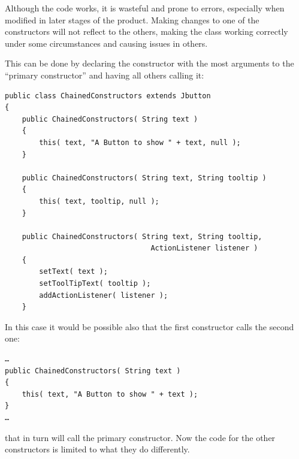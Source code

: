\documentclass[11pt,a4paper, titlepage, parskip=half, headsepline, footsepline, cleardoublepage=current, headheight=1cm]{scrbook}
\begin{document}
Although the code works, it is wasteful and prone to errors, especially when modified in later stages of the product. Making changes to one of the constructors will not reflect to the others, making the class working correctly under some circumstances and causing issues in others.

This can be done by declaring the constructor with the most arguments to the “primary constructor” and having all others calling it:
\begin{lstlisting}
public class ChainedConstructors extends Jbutton
{
    public ChainedConstructors( String text )
    {
        this( text, "A Button to show " + text, null );
    }
    
    public ChainedConstructors( String text, String tooltip )
    {
        this( text, tooltip, null );
    }
    
    public ChainedConstructors( String text, String tooltip,
                                  ActionListener listener )
    {
        setText( text );
        setToolTipText( tooltip );
        addActionListener( listener );
    }
\end{lstlisting}
In this case it would be possible also that the first constructor calls the second one:
\begin{lstlisting}
…
public ChainedConstructors( String text )
{
    this( text, "A Button to show " + text );
}
…
\end{lstlisting}
that in turn will call the primary constructor. Now the code for the other constructors is limited to what they do differently.
\end{document}
